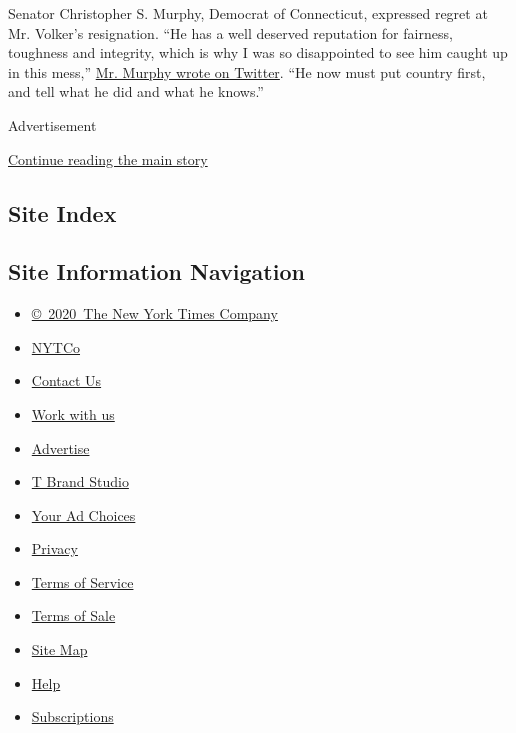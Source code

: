 Senator Christopher S. Murphy, Democrat of Connecticut, expressed regret
at Mr. Volker's resignation. ``He has a well deserved reputation for
fairness, toughness and integrity, which is why I was so disappointed to
see him caught up in this mess,''
\href{https://twitter.com/ChrisMurphyCT/status/1177760491617341440?s=20}{Mr.
Murphy wrote on Twitter}. ``He now must put country first, and tell what
he did and what he knows.''

Advertisement

\protect\hyperlink{after-bottom}{Continue reading the main story}

\hypertarget{site-index}{%
\subsection{Site Index}\label{site-index}}

\hypertarget{site-information-navigation}{%
\subsection{Site Information
Navigation}\label{site-information-navigation}}

\begin{itemize}
\tightlist
\item
  \href{https://help.nytimes.com/hc/en-us/articles/115014792127-Copyright-notice}{©~2020~The
  New York Times Company}
\end{itemize}

\begin{itemize}
\tightlist
\item
  \href{https://www.nytco.com/}{NYTCo}
\item
  \href{https://help.nytimes.com/hc/en-us/articles/115015385887-Contact-Us}{Contact
  Us}
\item
  \href{https://www.nytco.com/careers/}{Work with us}
\item
  \href{https://nytmediakit.com/}{Advertise}
\item
  \href{http://www.tbrandstudio.com/}{T Brand Studio}
\item
  \href{https://www.nytimes.com/privacy/cookie-policy\#how-do-i-manage-trackers}{Your
  Ad Choices}
\item
  \href{https://www.nytimes.com/privacy}{Privacy}
\item
  \href{https://help.nytimes.com/hc/en-us/articles/115014893428-Terms-of-service}{Terms
  of Service}
\item
  \href{https://help.nytimes.com/hc/en-us/articles/115014893968-Terms-of-sale}{Terms
  of Sale}
\item
  \href{https://spiderbites.nytimes.com}{Site Map}
\item
  \href{https://help.nytimes.com/hc/en-us}{Help}
\item
  \href{https://www.nytimes.com/subscription?campaignId=37WXW}{Subscriptions}
\end{itemize}
